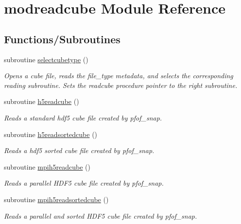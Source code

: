 \hypertarget{namespacemodreadcube}{}\section{modreadcube Module Reference}
\label{namespacemodreadcube}
\subsection*{Functions/\+Subroutines}
\begin{DoxyCompactItemize}
\item 
subroutine \hyperlink{namespacemodreadcube_a9c2a086c3d23dcb886817558a3592218}{selectcubetype} ()
\begin{DoxyCompactList}\small\item\em Opens a cube file, reads the file\+\_\+type metadata, and selects the corresponding reading subroutine. Sets the readcube procedure pointer to the right subroutine. \end{DoxyCompactList}\item 
subroutine \hyperlink{namespacemodreadcube_a9b00396dd9eab642a275a7aa06d9cd20}{h5readcube} ()
\begin{DoxyCompactList}\small\item\em Reads a standard hdf5 cube file created by pfof\+\_\+snap. \end{DoxyCompactList}\item 
subroutine \hyperlink{namespacemodreadcube_a30050fd5631222b0125e7917cc8ae547}{h5readsortedcube} ()
\begin{DoxyCompactList}\small\item\em Reads a hdf5 sorted cube file created by pfof\+\_\+snap. \end{DoxyCompactList}\item 
subroutine \hyperlink{namespacemodreadcube_af92f4077b7cf70887bb67a38909f1a27}{mpih5readcube} ()
\begin{DoxyCompactList}\small\item\em Reads a parallel H\+D\+F5 cube file created by pfof\+\_\+snap. \end{DoxyCompactList}\item 
subroutine \hyperlink{namespacemodreadcube_afc147b0f2e67c88cc8d7d0dd06ae8ff7}{mpih5readsortedcube} ()
\begin{DoxyCompactList}\small\item\em Reads a parallel and sorted H\+D\+F5 cube file created by pfof\+\_\+snap. \end{DoxyCompactList}\end{DoxyCompactItemize}
